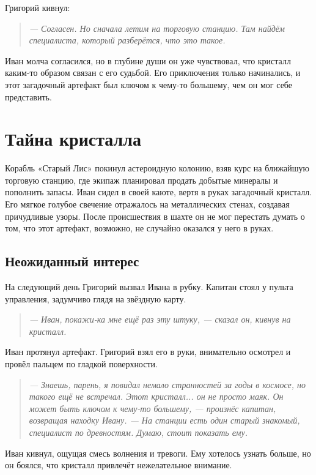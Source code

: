 \documentclass[12pt,a4paper]{book}
\newenvironment{dialogue}{\begin{quote}\itshape}{\end{quote}}
\begin{document}
Григорий кивнул:

\begin{dialogue}
--- Согласен. Но сначала летим на торговую станцию. Там найдём специалиста, который разберётся, что это такое.
\end{dialogue}

Иван молча согласился, но в глубине души он уже чувствовал, что кристалл каким-то образом связан с его судьбой. Его приключения только начинались, и этот загадочный артефакт был ключом к чему-то большему, чем он мог себе представить.

\chapter{Тайна кристалла}

Корабль «Старый Лис» покинул астероидную колонию, взяв курс на ближайшую торговую станцию, где экипаж планировал продать добытые минералы и пополнить запасы. Иван сидел в своей каюте, вертя в руках загадочный кристалл. Его мягкое голубое свечение отражалось на металлических стенах, создавая причудливые узоры. После происшествия в шахте он не мог перестать думать о том, что этот артефакт, возможно, не случайно оказался у него в руках.

\section*{Неожиданный интерес}

На следующий день Григорий вызвал Ивана в рубку. Капитан стоял у пульта управления, задумчиво глядя на звёздную карту.

\begin{dialogue}
--- Иван, покажи-ка мне ещё раз эту штуку, --- сказал он, кивнув на кристалл.
\end{dialogue}

Иван протянул артефакт. Григорий взял его в руки, внимательно осмотрел и провёл пальцем по гладкой поверхности.

\begin{dialogue}
--- Знаешь, парень, я повидал немало странностей за годы в космосе, но такого ещё не встречал. Этот кристалл... он не просто маяк. Он может быть ключом к чему-то большему, --- произнёс капитан, возвращая находку Ивану. --- На станции есть один старый знакомый, специалист по древностям. Думаю, стоит показать ему.
\end{dialogue}

Иван кивнул, ощущая смесь волнения и тревоги. Ему хотелось узнать больше, но он боялся, что кристалл привлечёт нежелательное внимание.
\end{document}
